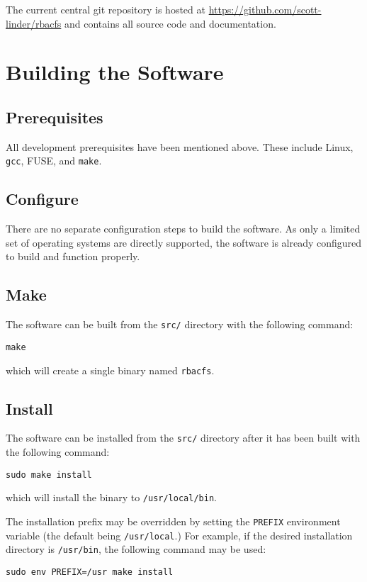 \documentclass[11pt,oneside,letterpaper]{article}
\begin{document}
The current central git repository is hosted at
\url{https://github.com/scott-linder/rbacfs} and contains all source code and
documentation.

\section{Building the Software}
\label{sec:build}

\subsection{Prerequisites}

All development prerequisites have been mentioned above. These include
Linux, {\tt gcc}, FUSE, and {\tt make}.

\subsection{Configure}

There are no separate configuration steps to build the software. As only a
limited set of operating systems are directly supported, the software is
already configured to build and function properly.

\subsection{Make}

The software can be built from the {\tt src/} directory with the following
command:
\begin{lstlisting}
make
\end{lstlisting}
which will create a single binary named {\tt rbacfs}.

\subsection{Install}

The software can be installed from the {\tt src/} directory after it has
been built with the following command:
\begin{lstlisting}
sudo make install
\end{lstlisting}
which will install the binary to {\tt /usr/local/bin}.

The installation prefix may be overridden by setting the {\tt PREFIX}
environment variable (the default being {\tt /usr/local}.) For example,
if the desired installation directory is {\tt /usr/bin}, the following
command may be used:
\begin{lstlisting}
sudo env PREFIX=/usr make install
\end{lstlisting}
\end{document}

